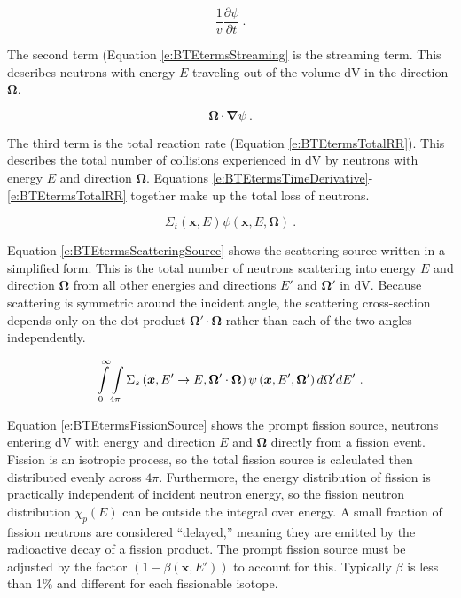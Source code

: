 \begin{equation}\label{e:BTEtermsTimeDerivative}
\frac{1}{v} \frac{\partial \psi}{\partial t}\ .
\end{equation}

The second term (Equation \ref{e:BTEtermsStreaming} is the streaming term.  This describes neutrons with energy $E$ traveling out of the volume dV in the direction $\bm\Omega$.

\begin{equation}\label{e:BTEtermsStreaming}
\bm \Omega \cdot \bm \nabla \psi\ .
\end{equation}

The third term is the total reaction rate (Equation \ref{e:BTEtermsTotalRR}).  This describes the total number of collisions experienced in dV by neutrons with energy $E$ and direction $\bm\Omega$.  Equations \ref{e:BTEtermsTimeDerivative}-\ref{e:BTEtermsTotalRR} together make up the total loss of neutrons.

\begin{equation}\label{e:BTEtermsTotalRR}
\Sigma_t\left(\bm x,E\right)\psi\left(\bm x,E,\bm\Omega\right)\ .
\end{equation}

Equation \ref{e:BTEtermsScatteringSource} shows the scattering source written in a simplified form.  This is the total number of neutrons scattering into energy $E$ and direction $\bm\Omega$ from all other energies and directions $E'$ and $\bm\Omega'$ in dV.  Because scattering is symmetric around the incident angle, the scattering cross-section depends only on the dot product $\bm\Omega'\cdot\bm\Omega$ rather than each of the two angles independently.

\begin{equation}\label{e:BTEtermsScatteringSource}
\intop_0^{\infty} \intop_{4\pi} \Sigma_s\left(\bm x,E' \rightarrow E, \bm \Omega' \cdot \bm \Omega\right) \psi\left(\bm x,E',\bm \Omega'\right) d\Omega' dE'\ .
\end{equation}

Equation \ref{e:BTEtermsFissionSource} shows the prompt fission source, neutrons entering dV with energy and direction $E$ and $\bm\Omega$ directly from a fission event.  Fission is an isotropic process, so the total fission source is calculated then distributed evenly across $4\pi$.  Furthermore, the energy distribution of fission is practically independent of incident neutron energy, so the fission neutron distribution $\chi_p\left(E\right)$ can be outside the integral over energy.  A small fraction of fission neutrons are considered ``delayed,'' meaning they are emitted by the radioactive decay of a fission product.  The prompt fission source must be adjusted by the factor $\left(1-\beta\left(\bm x,E'\right)\right)$ to account for this.  Typically $\beta$ is less than 1\% and different for each fissionable isotope.

